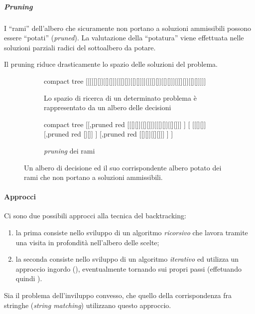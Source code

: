 \subparagraph{Pruning}
I \enquote{rami} dell'albero che sicuramente non portano a soluzioni ammissibili possono essere \enquote{potati} (\emph{pruned}).
La valutazione della \enquote{potatura} viene effettuata nelle soluzioni parziali radici del sottoalbero da potare.

\begin{note}
Il pruning riduce drasticamente lo spazio delle soluzioni del problema.
\end{note}

\begin{figure}
\begin{subfigure}[t]{.6\textwidth}
	\begin{forest} compact tree
	[[[[[][]][[][]]][[[][]][[][]]]][[[[][]][[][]]][[[][]][[][]]]]]
	\end{forest}
	\caption{Lo spazio di ricerca di un determinato problema è rappresentato da un albero delle decisioni}%
	\label{fig:tree-backtrack}
\end{subfigure}
\begin{subfigure}[t]{.4\textwidth}\flushright
	\begin{forest} compact tree
	[[,pruned red
		[[[][]][[][]]][[[][]][[][]]]
	]
	[
		[[[][]][,pruned red
			[][]]
		]
		[,pruned red
			[[][]][[][]]]
		]
	]
	\end{forest}
	\caption{\emph{pruning} dei rami}%
	\label{fig:tree-backtrack-pruned}
\end{subfigure}
\caption{Un albero di decisione ed il suo corrispondente albero potato dei rami che non portano a soluzioni ammissibili.}
\end{figure}

\paragraph{Approcci}
Ci sono due possibili approcci alla tecnica del backtracking:
\begin{enumerate}
	\item la prima consiste nello sviluppo di un algoritmo \emph{ricorsivo} che lavora tramite una visita in profondità nell'albero delle scelte;
	\item la seconda consiste nello sviluppo di un algoritmo \emph{iterativo} ed utilizza un approccio ingordo (), eventualmente tornando sui propri passi (effetuando quindi ).
\end{enumerate}

Sia il problema dell'inviluppo convesso, che quello della corrispondenza fra stringhe (\emph{string matching}) utilizzano questo approccio.

